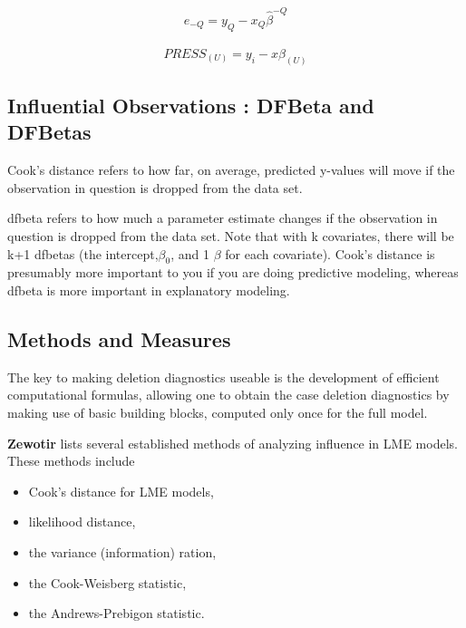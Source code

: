 \documentclass[12pt, a4paper]{report}
\begin{document}
\begin{equation}
e_{-Q} = y_{Q} - x_{Q}\hat{\beta}^{-Q}
\end{equation}

\begin{equation}
PRESS_{(U)} = y_{i} - x\hat{\beta}_{(U)}
\end{equation}





\subsection{Influential Observations : DFBeta and DFBetas}
Cook's distance refers to how far, on average, predicted y-values will move if the observation in question is dropped from the data set. 

dfbeta refers to how much a parameter estimate changes if the observation in question is dropped from the data set. Note that with k covariates, there will be k+1 dfbetas (the intercept,$\beta_0$, and 1 $\beta$ for each covariate). Cook's distance is presumably more important to you if you are doing predictive modeling, whereas dfbeta is more important in explanatory modeling.







\subsection{Methods and Measures}
The key to making deletion diagnostics useable is the development of efficient computational formulas, allowing one to obtain the  case deletion diagnostics by making use of basic building blocks, computed only once for the full model.

\textbf{Zewotir} lists several established methods of analyzing influence in LME models. These methods include 
\begin{itemize}
	\item Cook's distance for LME models,
	\item {} likelihood distance,
	\item the variance (information) ration,
	\item the  Cook-Weisberg statistic,
	\item the  Andrews-Prebigon statistic.
\end{itemize}
\end{document}
